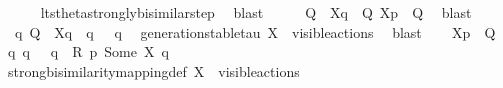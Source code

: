 \begin{isabellebody}
\ \ \ \ \isamarkupfalse%
\ lts{\isacharunderscore}{\kern0pt}theta{\isachardot}{\kern0pt}strongly{\isacharunderscore}{\kern0pt}bisimilar{\isacharunderscore}{\kern0pt}step{\isacharparenleft}{\kern0pt}{}{\isacharparenright}{\kern0pt}\ \isamarkupfalse%
\ blast\isanewline
\ \ \isamarkupfalse%
\ \isamarkupfalse%
\ Q{\isacharprime}{\kern0pt}\ \ {\isacartoucheopen}{\isasymtheta}{\isacharbrackleft}{\kern0pt}X{\isacharbrackright}{\kern0pt}{\isacharparenleft}{\kern0pt}q{\isacharparenright}{\kern0pt}\ {\isasymlongmapsto}\isactrlsup {\isasymtheta}{\isasymtau}\ Q{\isacharprime}{\kern0pt}{\isacartoucheclose}\ {\isacartoucheopen}{\isasymtheta}{\isacharbrackleft}{\kern0pt}X{\isacharbrackright}{\kern0pt}{\isacharparenleft}{\kern0pt}p{\isacharprime}{\kern0pt}{\isacharparenright}{\kern0pt}\ {\isasymleftrightarrow}\ Q{\isacharprime}{\kern0pt}{\isacartoucheclose}\ \isamarkupfalse%
\ blast\isanewline
\ \ \isamarkupfalse%
\ {\isacartoucheopen}{\isasymexists}\ q{\isacharprime}{\kern0pt}{\isachardot}{\kern0pt}\ Q{\isacharprime}{\kern0pt}\ {\isacharequal}{\kern0pt}\ {\isasymtheta}{\isacharbrackleft}{\kern0pt}X{\isacharbrackright}{\kern0pt}{\isacharparenleft}{\kern0pt}q{\isacharprime}{\kern0pt}{\isacharparenright}{\kern0pt}\ {\isasymand}\ q\ {\isasymlongmapsto}{\isasymtau}\ \ q{\isacharprime}{\kern0pt}{\isacartoucheclose}\ \isamarkupfalse%
\ generation{\isacharunderscore}{\kern0pt}stable{\isacharunderscore}{\kern0pt}tau\ {\isacartoucheopen}X\ {\isasymsubseteq}\ visible{\isacharunderscore}{\kern0pt}actions{\isacartoucheclose}\ \isamarkupfalse%
\ blast\isanewline
\ \ \isamarkupfalse%
\ {\isacartoucheopen}{\isasymtheta}{\isacharbrackleft}{\kern0pt}X{\isacharbrackright}{\kern0pt}{\isacharparenleft}{\kern0pt}p{\isacharprime}{\kern0pt}{\isacharparenright}{\kern0pt}\ {\isasymleftrightarrow}\ Q{\isacharprime}{\kern0pt}{\isacartoucheclose}\ \isamarkupfalse%
\ {\isacartoucheopen}{\isasymexists}q{\isacharprime}{\kern0pt}{\isachardot}{\kern0pt}\ q\ {\isasymlongmapsto}{\isasymtau}\ \ q{\isacharprime}{\kern0pt}\ {\isasymand}\ {\isacharquery}{\kern0pt}R\ p{\isacharprime}{\kern0pt}\ {\isacharparenleft}{\kern0pt}Some\ X{\isacharparenright}{\kern0pt}\ q{\isacharprime}{\kern0pt}{\isacartoucheclose}\ \isanewline
\ \ \ \ \isamarkupfalse%
\ strong{\isacharunderscore}{\kern0pt}bisimilarity{\isacharunderscore}{\kern0pt}mapping{\isacharunderscore}{\kern0pt}def\ {\isacartoucheopen}X\ {\isasymsubseteq}\ visible{\isacharunderscore}{\kern0pt}actions{\isacartoucheclose}\ \isamarkupfalse%

\end{isabellebody}
